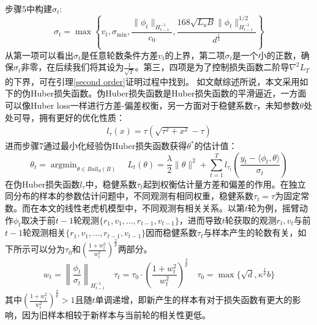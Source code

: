 \documentclass[UTF8,a4paper,10.5pt]{ctexart}
\newcommand{\Ccal}{\mathcal C}
\newcommand{\Dcal}{\mathcal D}
\newcommand{\argmax}{\mathop{\arg\max}}
\newcommand{\argmin}{\mathop{\arg\min}}
\begin{document}
步骤5中构建$\sigma_t$:
\begin{equation}
	\sigma_t= \max\left\{v_t, \sigma_{\min}, \frac{\|\phi_t\|_{H_{t-1}^{-1}}}{c_0}, \frac{168\sqrt{L_uB}\|\phi_t\|^{1/2}_{H_{t-1}^{-1}}}{d^{\frac{1}{4}}}\right\}
	\label{param1}
\end{equation}
从第一项可以看出$\sigma_t$是任意轮数条件方差$v_t$的上界，第二项$\sigma_t$是一个小的正数，确保$\sigma_t$非零，在后续我们将其设为$\frac{1}{\sqrt{T}}$。第三，四项是为了控制损失函数二阶导$\nabla^2L_T$的下界，可在引理\ref{second order}证明过程中找到。
如文献综述所说，本文采用如下的伪Huber损失函数。伪Huber损失函数是Huber损失函数的平滑逼近，一方面可以像Huber loss一样进行方差-偏差权衡，另一方面对于稳健系数$\tau$，未知参数$\theta$处处可导，拥有更好的优化性质：
\begin{align}
	l_{\tau}(x) = \tau(\sqrt{\tau^2+x^2}-\tau)
\end{align}
进而步骤7通过最小化经验伪Huber损失函数获得$\theta^*$的估计值：
\begin{equation*}
	\theta_t = \argmin_{\theta\in Ball_d(B)} \quad L_t(\theta) = \frac{\lambda}{2}\|\theta\|^2 + \sum_{t=1}^{T}l_{\tau_t}\left(\frac{y_t-\langle\phi_t,\theta\rangle}{\sigma_t}\right)
	\label{lossfunc}
\end{equation*}
在伪Huber损失函数$l_{\tau}$中，稳健系数$\tau_t$起到权衡估计量方差和偏差的作用。在独立同分布的样本的参数估计问题中，不同观测有相同权重，稳健系数$\tau_t = \tau$为固定常数。而在本文的线性老虎机模型中，不同观测有相关关系。以第$t$轮为例，摇臂动作$\phi_t$取决于前$t-1$轮观测$\{r_1,v_1,\ldots, r_{t-1},v_{t-1}\}$，进而导致$t$轮获取的观测$r_t,v_t$与前$t-1$轮观测相关$\{r_1,v_1,\ldots, r_{t-1},v_{t-1}\}$因而稳健系数$\tau_t$与样本产生的轮数有关，如下所示可以分为$\tau_0$和$\left(\frac{1+w_t^2}{w_t^2}\right)^{\frac{2}{p}}$两部分。
\begin{equation}
	w_t = \left\lVert \frac{\phi_t}{\sigma_t}\right\rVert_{H_{t-1}^{-1}} \quad \tau_t = \tau_0 \cdot \left(\frac{1+w_t^2}{w_t^2}\right)^{\frac{2}{p}} \quad \tau_0 = \max\{\sqrt{d}, \kappa^{\frac{1}{p}}b\}
	\label{param2}
\end{equation}
其中$\left(\frac{1+w_t^2}{w_t^2}\right)^{\frac{2}{p}} > 1$且随$t$单调递增，即新产生的样本有对于损失函数有更大的影响，因为旧样本相较于新样本与当前轮的相关性更低。



	
\end{document}

